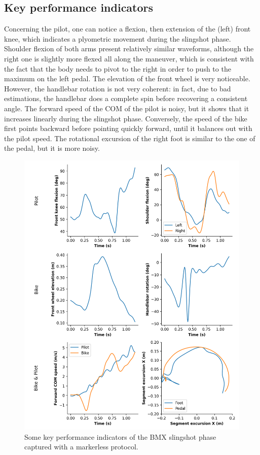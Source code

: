 \FloatBarrier
\subsection{Key performance indicators}

Concerning the pilot, one can notice a flexion, then extension of the (left) front knee, which indicates a plyometric movement during the slingshot phase. Shoulder flexion of both arms present relatively similar waveforms, although the right one is slightly more flexed all along the maneuver, which is consistent with the fact that the body needs to pivot to the right in order to push to the maximum on the left pedal. The elevation of the front wheel is very noticeable. However, the handlebar rotation is not very coherent: in fact, due to bad estimations, the handlebar does a complete spin before recovering a consistent angle. The forward speed of the COM of the pilot is noisy, but it shows that it increases linearly during the slingshot phase. Conversely, the speed of the bike first points backward before pointing quickly forward, until it balances out with the pilot speed. The rotational excursion of the right foot is similar to the one of the pedal, but it is more noisy. 

\begin{figure}[hbtp]
	\centering
	\def\svgwidth{1\columnwidth}
	\fontsize{10pt}{10pt}\selectfont
	\includegraphics[width=0.85\linewidth, left]{"../Chap7/Figures/KPIs_BMX.png"}
	\caption{Some key performance indicators of the BMX slingshot phase captured with a markerless protocol.}
	\label{fig_kpisbmx}
\end{figure}


